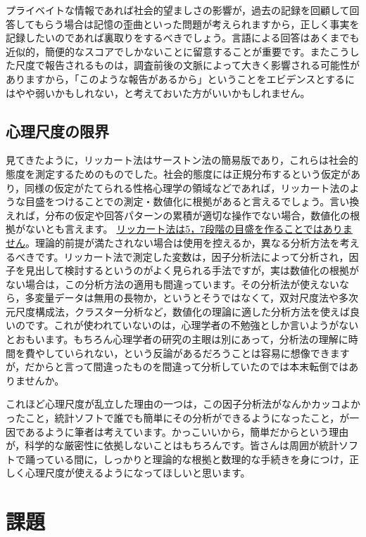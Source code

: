 \documentclass{ltjsbook}
\begin{document}
プライベイトな情報であれば社会的望ましさの影響が，過去の記録を回顧して回答してもらう場合は記憶の歪曲といった問題が考えられますから，正しく事実を記録したいのであれば裏取りをするべきでしょう。言語による回答はあくまでも近似的，簡便的なスコアでしかないことに留意することが重要です。またこうした尺度で報告されるものは，調査前後の文脈によって大きく影響される可能性がありますから，「このような報告があるから」ということをエビデンスとするにはやや弱いかもしれない，と考えておいた方がいいかもしれません。

\subsection{心理尺度の限界}

見てきたように，リッカート法はサーストン法の簡易版であり，これらは社会的態度を測定するためのものでした。社会的態度には正規分布するという仮定があり，同様の仮定がたてられる性格心理学の領域などであれば，リッカート法のような目盛をつけることでの測定・数値化に根拠があると言えるでしょう。言い換えれば，分布の仮定や回答パターンの累積が適切な操作でない場合，数値化の根拠がないとも言えます。
\underline{リッカート法は5，7段階の目盛を作ることではありません}。理論的前提が満たされない場合は使用を控えるか，異なる分析方法を考えるべきです。リッカート法で測定した変数は，因子分析法によって分析され，因子を見出して検討するというのがよく見られる手法ですが，実は数値化の根拠がない場合は，この分析方法の適用も間違っています。その分析法が使えないなら，多変量データは無用の長物か，というとそうではなくて，双対尺度法\parencite{Nishisato2010}や多次元尺度構成法\parencite{Takane198002}，クラスター分析\parencite{clusterAnalysis}など，数値化の理論に適した分析方法を使えば良いのです。これが使われていないのは，心理学者の不勉強としか言いようがないとおもいます。もちろん心理学者の研究の主眼は別にあって，分析法の理解に時間を費やしていられない，という反論があるだろうことは容易に想像できますが，だからと言って間違ったものを間違って分析していたのでは本末転倒ではありませんか。

これほど心理尺度が乱立した理由の一つは，この因子分析法がなんかカッコよかったこと，統計ソフトで誰でも簡単にその分析ができるようになったこと，が一因であるように筆者は考えています。かっこいいから，簡単だからという理由が，科学的な厳密性に依拠しないことはもちろんです。皆さんは周囲が統計ソフトで踊っている間に，しっかりと理論的な根拠と数理的な手続きを身につけ，正しく心理尺度が使えるようになってほしいと思います。


\section{課題}
\end{document}
